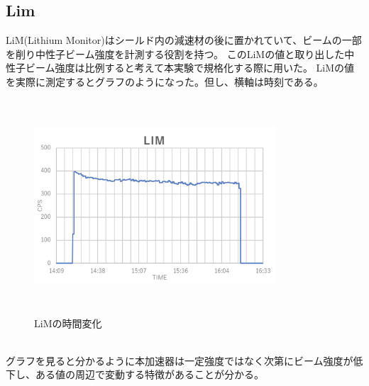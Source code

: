 \subsection{Lim}
LiM(Lithium Monitor)はシールド内の減速材の後に置かれていて、ビームの一部を削り中性子ビーム強度を計測する役割を持つ。
このLiMの値と取り出した中性子ビーム強度は比例すると考えて本実験で規格化する際に用いた。
LiMの値を実際に測定するとグラフのようになった。但し、横軸は時刻である。
\begin{figure}[h]
\centering
\includegraphics[width=9cm,height=8cm]{accelerator/LiM.pdf}\caption{LiMの時間変化}
\end{figure}\\
グラフを見ると分かるように本加速器は一定強度ではなく次第にビーム強度が低下し、ある値の周辺で変動する特徴があることが分かる。


